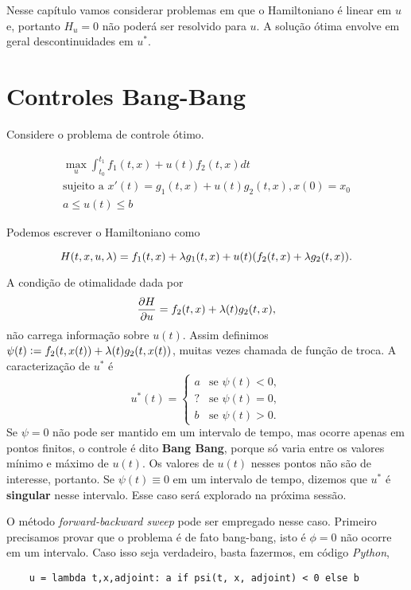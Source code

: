 Nesse capítulo vamos considerar problemas em que o Hamiltoniano é linear em
$u$ e, portanto $H_u = 0$ não poderá ser resolvido para $u$. A solução ótima
envolve em geral descontinuidades em $u^*$.  

\section{Controles Bang-Bang}

Considere o problema de controle ótimo.

\begin{gather*}
    \max_u \int_{t_0}^{t_1} f_1(t,x) + u(t)f_2(t,x) dt \\ 
    \text{sujeito a  }x'(t) = g_1(t,x) + u(t)g_2(t,x), x(0) = x_0 \\
    a \leq u(t) \leq b 
\end{gather*}

Podemos escrever o Hamiltoniano como 

$$H(t,x,u,\lambda) = f_1(t,x) + \lambda g_1(t,x) + u(t)(f_2(t,x) + \lambda g_2(t,x)).$$

A condição de otimalidade dada por
$$
\frac{\partial H}{\partial u} = f_2(t,x) + \lambda(t)g_2(t,x), 
$$
não carrega informação sobre $u(t)$. Assim definimos $\psi(t) := f_2(t,x(t)) +
\lambda(t)g_2(t,x(t))$, muitas vezes chamada de função de troca.  A caracterização
de $u^*$ é 
$$
u^*(t) = \begin{cases} 
    a &\text{se } \psi(t) < 0, \\
    ? &\text{se } \psi(t) = 0, \\
    b &\text{se } \psi(t) > 0. 
\end{cases}
$$
Se $\psi = 0$ não pode ser mantido em um intervalo de tempo, mas ocorre apenas
em pontos finitos, o controle é dito \textbf{Bang Bang}, porque só varia entre
os valores mínimo e máximo de $u(t)$. Os valores de $u(t)$ nesses pontos não
são de interesse, portanto. Se $\psi(t) \equiv 0$ em um intervalo de tempo,
dizemos que $u^*$ é \textbf{singular} nesse intervalo. Esse caso será explorado na próxima sessão. 

O método \textit{forward-backward sweep} pode ser empregado nesse caso.
Primeiro precisamos provar que o problema é de fato bang-bang, isto é $\phi =
0$ não ocorre em um intervalo.  Caso isso seja verdadeiro, basta
fazermos, em código \textit{Python}, 

\begin{verbatim}
    u = lambda t,x,adjoint: a if psi(t, x, adjoint) < 0 else b
\end{verbatim}

